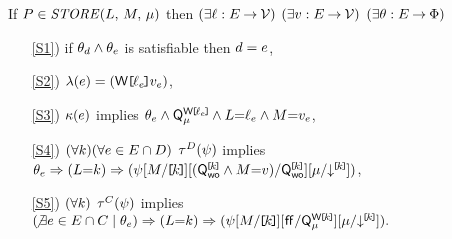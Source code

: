 \noindent
If $\aPS \in \sSTORE[\amode]{\cExp}{\aExp}$ then
$(\exists\ell:E\mathbin\rightarrow\mathcal{V})$
$(\exists v:E\mathbin\rightarrow\mathcal{V})$
$(\exists\theta:E\mathbin\rightarrow\Phi)$
\begin{enumerate}
\item[\ref{S1})] if $\theta_d\land\theta_e$ is satisfiable then $d=e$,
\item[\ref{S2})] $\labelingAct(\aEv) = \DWREFP{\cVal_\aEv}{\aVal_\aEv}$,
\item[\ref{S3})] 
  $\kappa(e)$ implies
  \begin{math}
    \theta_e
    \land \mathsf{Q}_{\mu}^{\mathsf{W}\mkern-2mu\texttt{[}\mkern-2mu\ell_e \mkern-2mu\texttt{]}\mkern-2mu}
    \land L{=}\ell_e
    \land M{=}v_e
  \end{math},
\item[\ref{S4})]
  \begin{math}
    (\forall k)
    (\forall e\in E\cap D)
  \end{math}
  $\aTr{\bEvs}{\bForm}$ implies 
  \begin{math}
    \theta_e
    \Rightarrow (L{=}k)
    \Rightarrow (
      \psi
      [M/\mkern-2mu\texttt{[}\mkern-2muk \mkern-2mu\texttt{]}\mkern-2mu]
      [(\mathsf{Q}_{\mathsf{wo}}^{\mkern-2mu\texttt{[}\mkern-2muk \mkern-2mu\texttt{]}\mkern-2mu}\land M{=}v)/\mathsf{Q}_{\mathsf{wo}}^{\mkern-2mu\texttt{[}\mkern-2muk \mkern-2mu\texttt{]}\mkern-2mu}]
      {[}{\mu}/\mathord{\downarrow^{\mkern-2mu\texttt{[}\mkern-2muk \mkern-2mu\texttt{]}\mkern-2mu}}{]}
    )
  \end{math},
\item[\ref{S5})] %
  \begin{math}
    (\forall k)
  \end{math}
  $\aTr{\cEvs}{\bForm}$ implies
  \begin{math}
    (\!\not\exists e\in E\cap C \mid \theta_e)
    \Rightarrow (L{=}k)
    \Rightarrow (
      \psi
      [M/\mkern-2mu\texttt{[}\mkern-2muk \mkern-2mu\texttt{]}\mkern-2mu]
      [\mkern.6mu\mathsf{ff}\mkern.6mu/\mathsf{Q}_{\mu}^{\mathsf{W}\mkern-2mu\texttt{[}\mkern-2muk \mkern-2mu\texttt{]}\mkern-2mu}]
      {[}{\mu}/\mathord{\downarrow^{\mkern-2mu\texttt{[}\mkern-2muk \mkern-2mu\texttt{]}\mkern-2mu}}{]}
    ).
  \end{math}
\end{enumerate}
